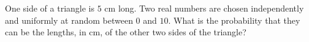 One side of a triangle is $5$ cm long. Two real numbers are chosen independently and uniformly at random between $0$ and $10$. What is the probability that they can be the lengths, in cm, of the other two sides of the triangle?
